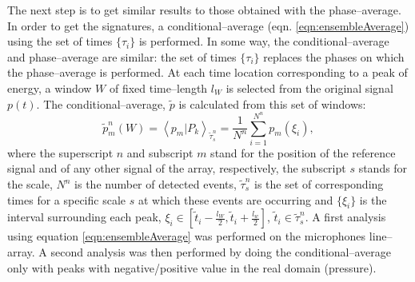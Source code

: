 \documentclass[english]{aiaa-tc}
\begin{document}
The next step is to get similar results to those obtained with the phase--average. In order to get the signatures, a conditional--average (eqn. \ref{eqn:ensembleAverage}) using the set of times $\{\tau_{i}\}$ is performed. In some way, the conditional--average and phase--average are similar: the set of times $\{\tau_{i}\}$ replaces the phases on which the phase--average is performed. At each time location corresponding to a peak of energy, a window $W$ of fixed time--length $l_{W}$ is selected from the original signal $p \left( t \right)$. The conditional--average, $\tilde{p}$ is calculated from this set of windows:
\begin{equation} \label{eqn:ensembleAverage}
    \tilde{p}^n_{m}\left( W \right) = \left< p_{m} | P_{k} \right>_{\tilde{\tau}^n_{s}} = \frac{1}{N^n} \sum^{N^n}_{i = 1} p_{m}\left(\xi_{i}\right),
\end{equation}
where the superscript $n$ and subscript $m$ stand for the position of the reference signal and of any other signal of the array, respectively, the subscript $s$ stands for the scale, $N^n$ is the number of detected events, $\tilde{\tau}^n_{s}$ is the set of corresponding times for a specific scale $s$ at which these events are occurring and $\{\xi_{i}\}$ is the interval surrounding each peak, $\xi_{i} \in \left[ \tilde{t}_{i} - \frac{l_W}{2}, \tilde{t}_{i} + \frac{l_w}{2} \right]$, $\tilde{t}_{i} \in \tilde{\tau}^n_{s}$.
A first analysis using equation \ref{eqn:ensembleAverage} was performed on the microphones line--array. A second analysis was then performed by doing the conditional--average only with peaks with negative/positive value in the real domain (pressure).
\end{document}
